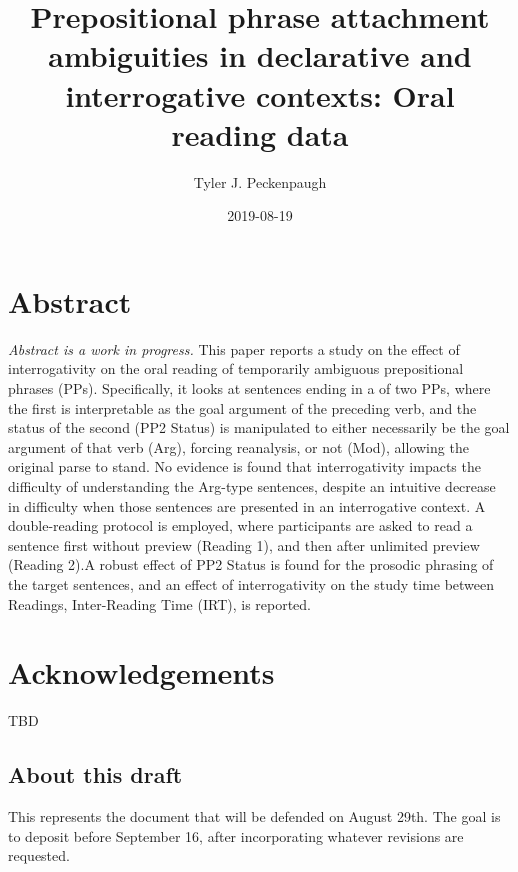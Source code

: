 \documentclass[12pt,oneside]{book}
\title{Prepositional phrase attachment ambiguities in declarative and interrogative contexts: Oral reading data}
\author{Tyler J. Peckenpaugh}
\date{2019-08-19}
\begin{document}
\maketitle

{
\setcounter{tocdepth}{1}
\tableofcontents
}
\listoftables
\listoffigures
\pagebreak

\raggedright

\hypertarget{abstract}{%
\chapter*{Abstract}\label{abstract}}

\emph{Abstract is a work in progress.} This paper reports a study on the effect of interrogativity on the oral reading of temporarily ambiguous prepositional phrases (PPs). Specifically, it looks at sentences ending in a of two PPs, where the first is interpretable as the goal argument of the preceding verb, and the status of the second (PP2 Status) is manipulated to either necessarily be the goal argument of that verb (Arg), forcing reanalysis, or not (Mod), allowing the original parse to stand. No evidence is found that interrogativity impacts the difficulty of understanding the Arg-type sentences, despite an intuitive decrease in difficulty when those sentences are presented in an interrogative context. A double-reading protocol is employed, where participants are asked to read a sentence first without preview (Reading 1), and then after unlimited preview (Reading 2).A robust effect of PP2 Status is found for the prosodic phrasing of the target sentences, and an effect of interrogativity on the study time between Readings, Inter-Reading Time (IRT), is reported.

\hypertarget{acknowledgements}{%
\chapter*{Acknowledgements}\label{acknowledgements}}

TBD

\hypertarget{about-this-draft}{%
\section*{About this draft}\label{about-this-draft}}

This represents the document that will be defended on August 29th. The goal is to deposit before September 16, after incorporating whatever revisions are requested.
\end{document}
